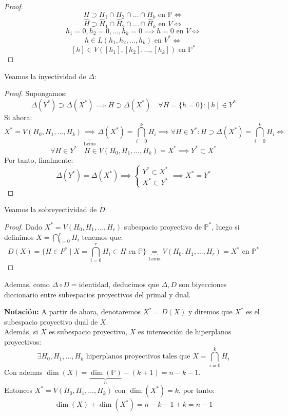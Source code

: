 \begin{proof}
    \[
    H \supset H_1 \cap H_2 \cap \ldots \cap H_k \text{ en } \mathbb{P} \iff
    \]
    \[
    \hat{H} \supset \hat{H}_1 \cap \hat{H}_2 \cap \ldots \cap \hat{H}_k \text{ en } V \iff
    \]
    \[
    h_1=0, h_2=0, \ldots, h_k=0 \implies h=0 \text{ en } V \iff
    \]
    \[
    h \in L \left( h_1, h_2, \ldots, h_k \right) \text{ en } V^* \iff
    \]
    \[
    [h] \in V\left( [h_1], [h_2], \ldots, [h_k] \right) \text{ en } \mathbb{P}^*
    \]
\end{proof}

Veamos la inyectividad de $\Delta$:

\begin{proof}
    Supongamos:
    \[
    \Delta(Y^*) \supset \Delta(X^*) \implies
    H \supset \Delta(X^*) \quad \forall H = \{h = 0\}: [h] \in Y^*
    \]
    Si ahora:
    \[
    X^* = V(H_0, H_1, \ldots, H_k) \underbrace{\implies}_{\text{Lema}}
    \Delta(X^*) = \bigcap_{i=0}^k H_i \implies
    \forall H \in Y^*: H \supset \Delta(X^*) = \bigcap_{i=0}^k H_i \iff
    \]
    \[
    \forall H \in Y^* \quad H \in V(H_0, H_1, \ldots, H_k) = X^* \implies
    Y^* \subset X^*
    \]
    Por tanto, finalmente:
    \[
    \Delta(Y^*) = \Delta(X^*) \implies
    \begin{cases}
        Y^* \subset X^* \\
        X^* \subset Y^*
    \end{cases} \implies
    X^* = Y^*
    \]
\end{proof}

Veamos la sobreyectividad de $D$:

\begin{proof}
    Dado $X^* = V(H_0, H_1, \ldots, H_r)$ subespacio proyectivo de $\mathbb{P}^*$, luego si definimos $X = \bigcap_{i=0}^r H_i$ tenemos que:
    \[
    D(X) =
    \{H \in P^* \mid X = \bigcap_{i=0}^r H_i \subset H \text{ en } \mathbb{P} \} \underbrace{=}_{\text{Lema}}
    V(H_0, H_1, \ldots, H_r) = X^* \text{ en } \mathbb{P}^*
    \] 
\end{proof}

Ademas, como $\Delta \circ D = \text{identidad}$, deducimos que $\Delta, D$ son biyecciones diccionario entre subespacios proyectivos del primal y dual.

\begin{observación}
    \textbf{Notación: } A partir de ahora, denotaremos $X^*=D(X)$ y diremos que $X^*$ es el subespacio proyectivo dual de $X$.\\
    Además, si $X$ es subespacio proyectivo, $X$ es intersección de hiperplanos proyectivos:
    \[
    \exists H_0, H_1, \ldots, H_k \text{ hiperplanos proyectivos tales que } X = \bigcap_{i=0}^k H_i
    \]
    Con ademas $\dim(X) = \underbrace{\dim(\mathbb{P})}_{n} - (k+1) = n - k - 1$.\\
    Entonces $X^* = V(H_0, H_1, \ldots, H_k)$ con $\dim(X^*) = k$, por tanto:
    \[
    \dim(X) + \dim(X^*) = n - k - 1 + k = n - 1
    \]
\end{observación}

